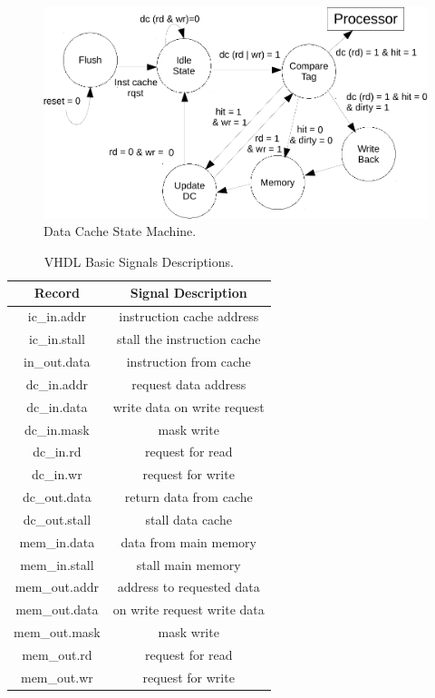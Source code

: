  \begin{figure}[tb!]
   \includegraphics[scale=0.8]{figures/img/data_cache_state.pdf}
   \caption{Data Cache State Machine.}
\label{fig:data_cache_state}
\end{figure}




\begin{table}[tb!]
\center
\caption{VHDL Basic Signals Descriptions.}


\begin{tabular}{|c | c|} 
 
 \hline
Record  & Signal Description  \\ 
\hline

 
 
 ic\_in.addr & instruction cache address  \\
 ic\_in.stall & stall the instruction cache  \\ 
 \hline
 
 in\_out.data & instruction from cache \\
 dc\_in.addr & request data address\\
 dc\_in.data & write data on write request \\
 dc\_in.mask & mask write \\
 dc\_in.rd &  request for read \\
 dc\_in.wr & request for write \\
 \hline

 dc\_out.data & return data from cache \\
 dc\_out.stall & stall data cache \\
 mem\_in.data & data from main memory \\
 mem\_in.stall & stall main memory \\
 \hline
 mem\_out.addr & address to requested data\\
 mem\_out.data & on write request write data\\
 mem\_out.mask & mask write\\
 mem\_out.rd & request for read\\
 mem\_out.wr & request for write\\
 
 \hline
 
 

\end{tabular}
\end{table}

